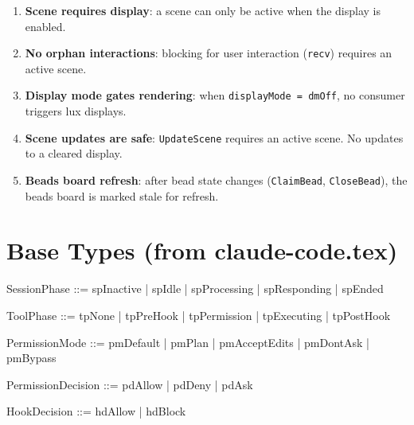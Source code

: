 \documentclass[a4paper,10pt,fleqn]{article}
\begin{document}
\begin{enumerate}
  \item \textbf{Scene requires display}: a scene can only be active
    when the display is enabled.
  \item \textbf{No orphan interactions}: blocking for user interaction
    (\texttt{recv}) requires an active scene.
  \item \textbf{Display mode gates rendering}: when
    \texttt{displayMode = dmOff}, no consumer triggers lux displays.
  \item \textbf{Scene updates are safe}: \texttt{UpdateScene} requires
    an active scene. No updates to a cleared display.
  \item \textbf{Beads board refresh}: after bead state changes
    (\texttt{ClaimBead}, \texttt{CloseBead}), the beads board is
    marked stale for refresh.
\end{enumerate}

\section{Base Types (from claude-code.tex)}

\begin{zed}
\end{zed}

\begin{zed}
  SessionPhase ::= spInactive | spIdle | spProcessing | spResponding | spEnded
\end{zed}

\begin{zed}
  ToolPhase ::= tpNone | tpPreHook | tpPermission | tpExecuting | tpPostHook
\end{zed}

\begin{zed}
  PermissionMode ::= pmDefault | pmPlan | pmAcceptEdits | pmDontAsk | pmBypass
\end{zed}

\begin{zed}
  PermissionDecision ::= pdAllow | pdDeny | pdAsk
\end{zed}

\begin{zed}
  HookDecision ::= hdAllow | hdBlock
\end{zed}
\end{document}
